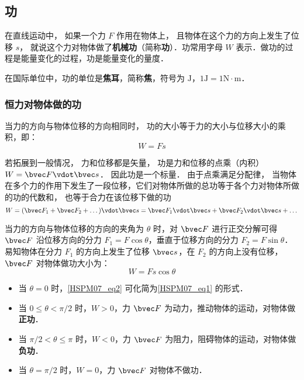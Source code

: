 

\subsection{功}

在直线运动中， 如果一个力 $F$ 作用在物体上， 且物体在这个力的方向上发生了位移 $s$， 就说这个力对物体做了\textbf{机械功}（简称\textbf{功}）．功常用字母 $W$ 表示．做功的过程是能量变化的过程，功是能量变化的量度．

在国际单位中，功的单位是\textbf{焦耳}，简称\textbf{焦}，符号为 $\mathrm{J}$，$1\mathrm{J}=1\mathrm{N \cdot m}$．

\subsubsection{恒力对物体做的功}

当力的方向与物体位移的方向相同时， 功的大小等于力的大小与位移大小的乘积，即：
\begin{equation}\label{HSPM07_eq1}
W=Fs
\end{equation}

若拓展到一般情况， 力和位移都是矢量， 功是力和位移的点乘（内积） $W = \bvec F \vdot \bvec s$． 因此功是一个标量． 由于点乘满足分配律， 当物体在多个力的作用下发生了一段位移，它们对物体所做的总功等于各个力对物体所做的功的代数和， 也等于合力在该位移下做的功
\begin{equation}
W = (\bvec F_1 + \bvec F_2 + \dots)\vdot \bvec s = \bvec F_1 \vdot \bvec s + \bvec F_2 \vdot \bvec s + \dots
\end{equation}

当力的方向与物体位移的方向的夹角为 $\theta$ 时，对 $\bvec F$ 进行正交分解可得 $\bvec F$ 沿位移方向的分力 $F_1=F\cos \theta$，垂直于位移方向的分力 $F_2=F\sin \theta$．易知物体在分力 $F_1$ 的方向上发生了位移 $\bvec s$，在 $F_2$ 的方向上没有位移，$\bvec F$ 对物体做功大小为：
\begin{equation}\label{HSPM07_eq2}
W=Fs\cos \theta
\end{equation}

\begin{itemize}
\item 当 $\theta = 0$ 时，\autoref{HSPM07_eq2} 可化简为\autoref{HSPM07_eq1} 的形式．
\item 当 $0\leq \theta < \pi/2$ 时，$W>0$，力 $\bvec F$ 为动力，推动物体的运动，对物体做\textbf{正功}．
\item 当 $\pi/2< \theta \leq \pi$ 时，$W<0$，力 $\bvec F$ 为阻力，阻碍物体的运动，对物体做\textbf{负功}．
\item 当 $\theta = \pi/2$ 时，$W=0$，力 $\bvec F$ 对物体不做功．
\end{itemize}

